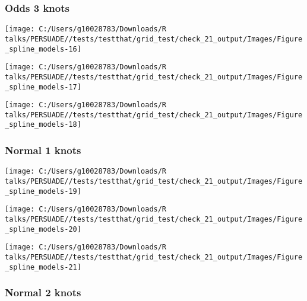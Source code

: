 \documentclass[
]{article}
\begin{document}
\clearpage

\subsubsection{Odds 3 knots}\label{odds-3-knots}

\begin{flushleft}\texttt{[image: C:/Users/g10028783/Downloads/R talks/PERSUADE//tests/testthat/grid\_test/check\_21\_output/Images/Figure\_spline\_models-16]} \end{flushleft}

\begin{flushleft}\texttt{[image: C:/Users/g10028783/Downloads/R talks/PERSUADE//tests/testthat/grid\_test/check\_21\_output/Images/Figure\_spline\_models-17]} \end{flushleft}

\begin{flushleft}\texttt{[image: C:/Users/g10028783/Downloads/R talks/PERSUADE//tests/testthat/grid\_test/check\_21\_output/Images/Figure\_spline\_models-18]} \end{flushleft}

\clearpage

\subsubsection{Normal 1 knots}\label{normal-1-knots}

\begin{flushleft}\texttt{[image: C:/Users/g10028783/Downloads/R talks/PERSUADE//tests/testthat/grid\_test/check\_21\_output/Images/Figure\_spline\_models-19]} \end{flushleft}

\begin{flushleft}\texttt{[image: C:/Users/g10028783/Downloads/R talks/PERSUADE//tests/testthat/grid\_test/check\_21\_output/Images/Figure\_spline\_models-20]} \end{flushleft}

\begin{flushleft}\texttt{[image: C:/Users/g10028783/Downloads/R talks/PERSUADE//tests/testthat/grid\_test/check\_21\_output/Images/Figure\_spline\_models-21]} \end{flushleft}

\clearpage

\subsubsection{Normal 2 knots}\label{normal-2-knots}
\end{document}
